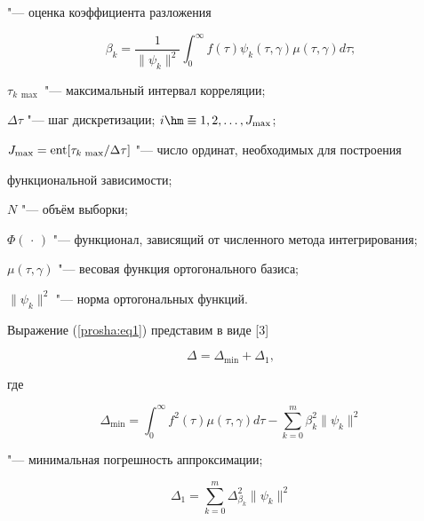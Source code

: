"--- оценка коэффициента разложения

\begin{equation}

\label{prosha:eq3}

\beta _k =\frac{1}{ \|\psi _k \|^2}\int_0^\infty f (\tau ) \psi _k  (\tau , \gamma )\mu (\tau , \gamma)d\tau ;

\end{equation}

$\tau _{k\,\max } $ "--- максимальный интервал корреляции;

$\Delta \tau $ "--- шаг дискретизации; $i \hm \equiv 1, 2, \dots, J_{\max }$;

$J_{\max } = {\rm ent} [ \tau _{k\,\max }/ \Delta \tau ]$ "--- число ординат, необходимых для построения

функциональной зависимости;

$N$ "--- объём выборки;

$\Phi (\,{\cdot}\,)$ "--- функционал, зависящий от численного метода интегрирования;

$\mu  (\tau , \gamma )$ "--- весовая функция ортогонального базиса;

$ \| {\psi _k }  \|^2$ "--- норма ортогональных функций.



Выражение (\ref{prosha:eq1}) представим в виде [3]

\begin{equation}

\label{prosha:eq4}

\Delta =\Delta _{\min } +\Delta _1,

\end{equation}

где

\begin{equation}

\label{prosha:eq5}

\Delta _{\min} =\int_0^\infty f^2 (\tau )\mu (\tau, \gamma) d\tau  -

\sum\limits_{k=0}^m \beta _k^2  \| \psi _k  \|^2

\end{equation}

"--- минимальная погрешность аппроксимации;

\begin{equation}

\label{prosha:eq6}

\Delta _1 =\sum\limits_{k=0}^m \Delta _{\beta _k } ^2 \| \psi _k  \|^2

\end{equation}

